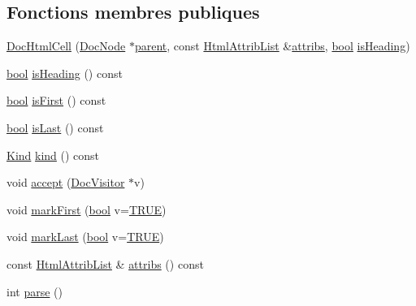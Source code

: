 \subsection*{Fonctions membres publiques}
\begin{DoxyCompactItemize}
\item 
\hyperlink{class_doc_html_cell_a408005d09b36012a9aa432df386a8ed0}{Doc\+Html\+Cell} (\hyperlink{class_doc_node}{Doc\+Node} $\ast$\hyperlink{class_doc_node_a990d8b983962776a647e6231d38bd329}{parent}, const \hyperlink{class_html_attrib_list}{Html\+Attrib\+List} \&\hyperlink{class_doc_html_cell_a44edb472040558280343bd63bcc6192a}{attribs}, \hyperlink{qglobal_8h_a1062901a7428fdd9c7f180f5e01ea056}{bool} \hyperlink{class_doc_html_cell_aec60f6b9943eb73cc5e0e9fd930aec15}{is\+Heading})
\item 
\hyperlink{qglobal_8h_a1062901a7428fdd9c7f180f5e01ea056}{bool} \hyperlink{class_doc_html_cell_aec60f6b9943eb73cc5e0e9fd930aec15}{is\+Heading} () const 
\item 
\hyperlink{qglobal_8h_a1062901a7428fdd9c7f180f5e01ea056}{bool} \hyperlink{class_doc_html_cell_abc25e29d4e00822b9f40217da6e00cc7}{is\+First} () const 
\item 
\hyperlink{qglobal_8h_a1062901a7428fdd9c7f180f5e01ea056}{bool} \hyperlink{class_doc_html_cell_ad0ee2ef185bd6cee0a7c23488b07bd7e}{is\+Last} () const 
\item 
\hyperlink{class_doc_node_aebd16e89ca590d84cbd40543ea5faadb}{Kind} \hyperlink{class_doc_html_cell_a3875c8b0c463b0b436baf054f7ed78d7}{kind} () const 
\item 
void \hyperlink{class_doc_html_cell_a52cc927e1684777332944884f2ee9869}{accept} (\hyperlink{class_doc_visitor}{Doc\+Visitor} $\ast$v)
\item 
void \hyperlink{class_doc_html_cell_ab472d7aee599717c94c69ab137310d2c}{mark\+First} (\hyperlink{qglobal_8h_a1062901a7428fdd9c7f180f5e01ea056}{bool} v=\hyperlink{qglobal_8h_a04a6422a52070f0dc478693da640242b}{T\+R\+U\+E})
\item 
void \hyperlink{class_doc_html_cell_a50c10a42581d4ae558776aa2d7528cd2}{mark\+Last} (\hyperlink{qglobal_8h_a1062901a7428fdd9c7f180f5e01ea056}{bool} v=\hyperlink{qglobal_8h_a04a6422a52070f0dc478693da640242b}{T\+R\+U\+E})
\item 
const \hyperlink{class_html_attrib_list}{Html\+Attrib\+List} \& \hyperlink{class_doc_html_cell_a44edb472040558280343bd63bcc6192a}{attribs} () const 
\item 
int \hyperlink{class_doc_html_cell_ad1dda118e2ea47235f3880e56ae6e2a8}{parse} ()

\end{DoxyCompactItemize}
